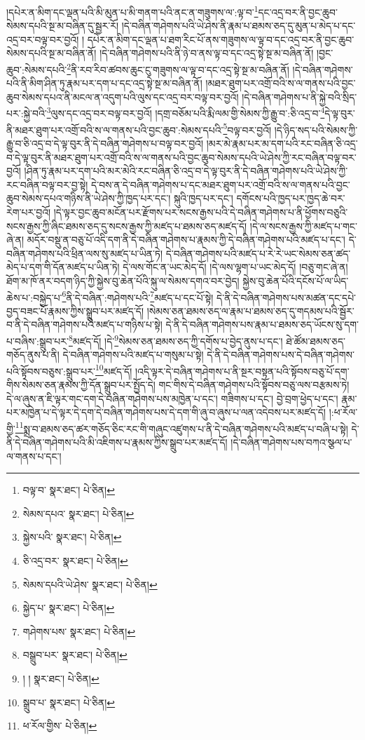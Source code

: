 །དཔེར་ན་མིག་དང་ལྡན་པའི་མི་མུན་པ་མི་གནག་པའི་ནང་ན་གཟུགས་ལ་:ལྟ་བ་\footnote{བལྟ་བ་  སྣར་ཐང་།  པེ་ཅིན། }དང་འདྲ་བར་ནི་བྱང་ཆུབ་སེམས་དཔའི་སྔ་མ་བཞིན་དུ་སྦྱར་རོ། །དེ་བཞིན་གཤེགས་པའི་ཡེ་ཤེས་ནི་རྣམ་པ་ཐམས་ཅད་དུ་མུན་པ་མེད་པ་དང་འདྲ་བར་བལྟ་བར་བྱའོ། །
དཔེར་ན་མིག་དང་ལྡན་པ་ཐག་རིང་པོ་ནས་གཟུགས་ལ་ལྟ་བ་དང་འདྲ་བར་ནི་བྱང་ཆུབ་སེམས་དཔའི་སྔ་མ་བཞིན་ནོ། །དེ་བཞིན་གཤེགས་པའི་ནི་ཉེ་བ་ནས་ལྟ་བ་དང་འདྲ་སྟེ་སྔ་མ་བཞིན་ནོ། །བྱང་ཆུབ་:སེམས་དཔའི་\footnote{སེམས་དཔའ་  སྣར་ཐང་།  པེ་ཅིན། }ནི་རབ་རིབ་ཚབས་ཆུང་ངུ་གཟུགས་ལ་ལྟ་བ་དང་འདྲ་སྟེ་སྔ་མ་བཞིན་ནོ། །དེ་བཞིན་གཤེགས་པའི་ནི་མིག་ཤིན་ཏུ་རྣམ་པར་དག་པ་དང་འདྲ་སྟེ་སྔ་མ་བཞིན་ནོ། །མཐར་ཐུག་པར་འགྲོ་བའི་ས་ལ་གནས་པའི་བྱང་ཆུབ་སེམས་དཔའ་ནི་མངལ་ན་འདུག་པའི་ལུས་དང་འདྲ་བར་བལྟ་བར་བྱའོ། །དེ་བཞིན་གཤེགས་པ་ནི་སྐྱེ་བའི་སྲིད་པར་:སྐྱེ་བའི་\footnote{སྐྱེས་པའི་  སྣར་ཐང་།  པེ་ཅིན། }ལུས་དང་འདྲ་བར་བལྟ་བར་བྱའོ། །དགྲ་བཅོམ་པའི་རྨི་ལམ་གྱི་སེམས་ཀྱི་རྒྱུ་བ་:ཅི་འདྲ་བ་\footnote{ཅི་འདྲ་བར་  སྣར་ཐང་།  པེ་ཅིན། }དེ་ལྟ་བུར་ནི་མཐར་ཐུག་པར་འགྲོ་བའི་ས་ལ་གནས་པའི་བྱང་ཆུབ་:སེམས་དཔའི་\footnote{སེམས་དཔའི་ཡེ་ཤེས་  སྣར་ཐང་།  པེ་ཅིན། }བལྟ་བར་བྱའོ། །དེ་ཉིད་སད་པའི་སེམས་ཀྱི་རྒྱུ་བ་ཅི་འདྲ་བ་དེ་ལྟ་བུར་ནི་དེ་བཞིན་གཤེགས་པ་བལྟ་བར་བྱའོ། །མར་མེ་རྣམ་པར་མ་དག་པའི་རང་བཞིན་ཅི་འདྲ་བ་དེ་ལྟ་བུར་ནི་མཐར་ཐུག་པར་འགྲོ་བའི་ས་ལ་གནས་པའི་བྱང་ཆུབ་སེམས་དཔའི་ཡེ་ཤེས་ཀྱི་རང་བཞིན་བལྟ་བར་བྱའོ། །ཤིན་ཏུ་རྣམ་པར་དག་པའི་མར་མེའི་རང་བཞིན་ཅི་འདྲ་བ་དེ་ལྟ་བུར་ནི་དེ་བཞིན་གཤེགས་པའི་ཡེ་ཤེས་ཀྱི་རང་བཞིན་བལྟ་བར་བྱ་སྟེ། དེ་བས་ན་དེ་བཞིན་གཤེགས་པ་དང་མཐར་ཐུག་པར་འགྲོ་བའི་ས་ལ་གནས་པའི་བྱང་ཆུབ་སེམས་དཔའ་གཉིས་ནི་ཡེ་ཤེས་ཀྱི་ཁྱད་པར་དང་། སྐུའི་ཁྱད་པར་དང་། དགོངས་པའི་ཁྱད་པར་ཁྱད་ཆེ་བར་རེག་པར་བྱའོ། །དེ་ལྟར་བྱང་ཆུབ་མངོན་པར་རྫོགས་པར་སངས་རྒྱས་པའི་དེ་བཞིན་གཤེགས་པ་ནི་ཕྱོགས་བཅུའི་སངས་རྒྱས་ཀྱི་ཞིང་ཐམས་ཅད་དུ་སངས་རྒྱས་ཀྱི་མཛད་པ་ཐམས་ཅད་མཛད་དོ། །དེ་ལ་སངས་རྒྱས་ཀྱི་མཛད་པ་གང་ཞེ་ན། མདོར་བསྡུ་ན་བཅུ་པོ་འདི་དག་ནི་དེ་བཞིན་གཤེགས་པ་རྣམས་ཀྱི་དེ་བཞིན་གཤེགས་པའི་མཛད་པ་དང་། དེ་བཞིན་གཤེགས་པའི་ཕྲིན་ལས་སུ་མཛད་པ་ཡིན་ཏེ། དེ་བཞིན་གཤེགས་པའི་མཛད་པ་རེ་རེ་ཡང་སེམས་ཅན་ཚད་མེད་པ་དག་གི་དོན་མཛད་པ་ཡིན་ཏེ། དེ་ལས་གོང་ན་ཡང་མེད་དོ། །དེ་ལས་ལྷག་པ་ཡང་མེད་དོ། །བཅུ་གང་ཞེ་ན། ཐོག་མ་ཁོ་ནར་བདག་ཉིད་ཀྱི་སྐྱེས་བུ་ཆེན་པོའི་སྐུ་ལ་སེམས་དགའ་བར་བྱེད། སྐྱེས་བུ་ཆེན་པོའི་དངོས་པོ་ལ་ཡིད་ཆེས་པ་:བསྐྱེད་པ་\footnote{སྐྱེད་པ་  སྣར་ཐང་།  པེ་ཅིན། }ནི་དེ་བཞིན་:གཤེགས་པའི་\footnote{གཤེགས་པས་  སྣར་ཐང་།  པེ་ཅིན། }མཛད་པ་དང་པོ་སྟེ། དེ་ནི་དེ་བཞིན་གཤེགས་པས་མཚན་དང་དཔེ་བྱད་བཟང་པོ་རྣམས་ཀྱིས་སྒྲུབ་པར་མཛད་དོ། །སེམས་ཅན་ཐམས་ཅད་ལ་རྣམ་པ་ཐམས་ཅད་དུ་གདམས་པའི་སྦྱོར་བ་ནི་དེ་བཞིན་གཤེགས་པའི་མཛད་པ་གཉིས་པ་སྟེ། དེ་ནི་དེ་བཞིན་གཤེགས་པས་རྣམ་པ་ཐམས་ཅད་ཡོངས་སུ་དག་པ་བཞིས་:སྒྲུབ་པར་\footnote{བསྒྲུབ་པར་  སྣར་ཐང་།  པེ་ཅིན། }མཛད་དོ། །དེ་\footnote{། །  སྣར་ཐང་།  པེ་ཅིན། }སེམས་ཅན་ཐམས་ཅད་ཀྱི་དགོས་པ་བྱེད་ནུས་པ་དང་། ཐེ་ཚོམ་ཐམས་ཅད་གཅོད་ནུས་པ་ནི། དེ་བཞིན་གཤེགས་པའི་མཛད་པ་གསུམ་པ་སྟེ། དེ་ནི་དེ་བཞིན་གཤེགས་པས་དེ་བཞིན་གཤེགས་པའི་སྟོབས་བཅུས་:སྒྲུབ་པར་\footnote{སྒྲུབ་པ་  སྣར་ཐང་།  པེ་ཅིན། }མཛད་དོ། །འདི་ལྟར་དེ་བཞིན་གཤེགས་པ་ནི་སྔར་བསྟན་པའི་སྟོབས་བཅུ་པོ་དག་གིས་སེམས་ཅན་རྣམས་ཀྱི་དོན་སྒྲུབ་པར་སྤྱོད་དེ། གང་གིས་དེ་བཞིན་གཤེགས་པའི་སྟོབས་བཅུ་ལས་བརྩམས་ཏེ། དེ་ལ་ཞུས་ན་ཇི་ལྟར་གང་དག་དེ་བཞིན་གཤེགས་པས་མཁྱེན་པ་དང་། གཟིགས་པ་དང་། བྱེ་བྲག་ཕྱེད་པ་དང་། རྣམ་པར་མཁྱེན་པ་དེ་ལྟར་དེ་དག་དེ་བཞིན་གཤེགས་པས་དེ་དག་གི་ཞུ་བ་ཞུས་པ་ལན་འདེབས་པར་མཛད་དོ། །:ཕ་རོལ་གྱི་\footnote{ཕ་རོལ་གྱིས་  པེ་ཅིན། }སྨྲ་བ་ཐམས་ཅད་ཚར་གཅོད་ཅིང་རང་གི་གཞུང་འཛུགས་པ་ནི་དེ་བཞིན་གཤེགས་པའི་མཛད་པ་བཞི་པ་སྟེ། དེ་ནི་དེ་བཞིན་གཤེགས་པའི་མི་འཇིགས་པ་རྣམས་ཀྱིས་སྒྲུབ་པར་མཛད་དོ། །དེ་བཞིན་གཤེགས་པས་བཀའ་སྩལ་པ་ལ་གནས་པ་དང་། 